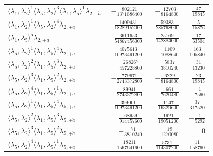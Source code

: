 \begin{longtable}{@{}lrrr@{}}
$\langle\lambda_1,\lambda_2\rangle^{1}\langle\lambda_5,\lambda_2\rangle^{3}\langle\lambda_1,\lambda_5\rangle^{1}\lambda_{2,+\dot a}$ & $-\frac{802121}{1371686400}$ & $-\frac{12703}{8164800}$ & $\frac{47}{19845}$ \\
$\langle\lambda_1,\lambda_2\rangle^{1}\langle\lambda_5,\lambda_2\rangle^{4}\lambda_{2,+\dot a}$ & $\frac{1409431}{18289152000}$ & $\frac{59383}{285768000}$ & $-\frac{5}{15876}$ \\
$\langle\lambda_1,\lambda_5\rangle^{5}\lambda_{2,+\dot a}$ & $\frac{3611653}{54867456000}$ & $\frac{25169}{142884000}$ & $-\frac{17}{63504}$ \\
$\langle\lambda_5,\lambda_2\rangle^{1}\langle\lambda_1,\lambda_5\rangle^{4}\lambda_{2,+\dot a}$ & $-\frac{4075613}{10973491200}$ & $-\frac{1109}{1088640}$ & $\frac{163}{105840}$ \\
$\langle\lambda_5,\lambda_2\rangle^{2}\langle\lambda_1,\lambda_5\rangle^{3}\lambda_{2,+\dot a}$ & $\frac{268267}{457228800}$ & $\frac{5837}{3810240}$ & $-\frac{31}{13230}$ \\
$\langle\lambda_5,\lambda_2\rangle^{3}\langle\lambda_1,\lambda_5\rangle^{2}\lambda_{2,+\dot a}$ & $-\frac{779671}{2743372800}$ & $-\frac{6229}{8164800}$ & $\frac{23}{19845}$ \\
$\langle\lambda_5,\lambda_2\rangle^{4}\langle\lambda_1,\lambda_5\rangle^{1}\lambda_{2,+\dot a}$ & $\frac{89941}{2743372800}$ & $\frac{661}{7620480}$ & $-\frac{1}{7560}$ \\
$\langle\lambda_5,\lambda_2\rangle^{1}\langle\lambda_1,\lambda_5\rangle^{4}\lambda_{5,+\dot a}$ & $-\frac{399001}{10973491200}$ & $-\frac{1147}{16329600}$ & $\frac{37}{317520}$ \\
$\langle\lambda_5,\lambda_2\rangle^{2}\langle\lambda_1,\lambda_5\rangle^{3}\lambda_{5,+\dot a}$ & $\frac{68959}{914457600}$ & $\frac{1921}{19051200}$ & $-\frac{1}{5292}$ \\
$\langle\lambda_5,\lambda_2\rangle^{3}\langle\lambda_1,\lambda_5\rangle^{2}\lambda_{5,+\dot a}$ & $-\frac{71}{3810240}$ & $\frac{19}{1270080}$ & $0$ \\
$\langle\lambda_5,\lambda_2\rangle^{4}\langle\lambda_1,\lambda_5\rangle^{1}\lambda_{5,+\dot a}$ & $-\frac{18211}{1567641600}$ & $-\frac{5731}{114307200}$ & $\frac{11}{158760}$ \\
\end{longtable}
